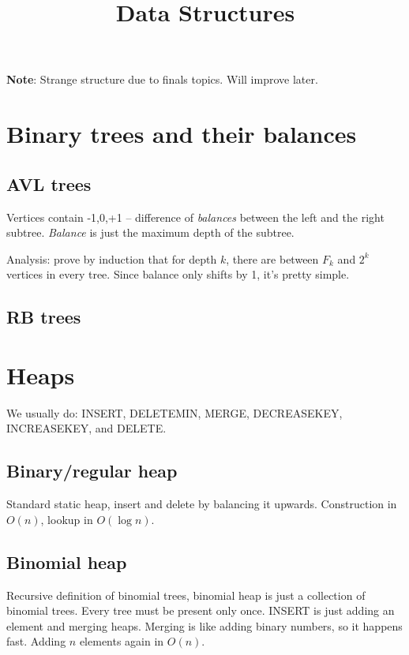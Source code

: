

\def\len{{\rm len}}


\title{Data Structures}

{\bf Note}: Strange structure due to finals topics.
Will improve later.

\section{Binary trees and their balances}

\subsection{AVL trees}

Vertices contain {-1,0,+1} -- difference of {\it balances} between the left
and the right subtree. {\it Balance} is just the maximum depth of the subtree.

Analysis: prove by induction that for depth $k$, there are between $F_k$ and $2^k$
vertices in every tree. Since balance only shifts by 1, it's pretty simple.

\subsection{RB trees}

\section{Heaps}

We usually do: INSERT, DELETEMIN, MERGE, DECREASEKEY, INCREASEKEY, and DELETE.

\subsection{Binary/regular heap}

Standard static heap, insert and delete by balancing it upwards.
Construction in $O(n)$, lookup in $O(\log n)$.

\subsection{Binomial heap}

Recursive definition of binomial trees, binomial heap is just a collection of
binomial trees. Every tree must be present only once. INSERT is just adding
an element and merging heaps. Merging is like adding binary numbers, so it happens
fast. Adding $n$ elements again in $O(n)$.


